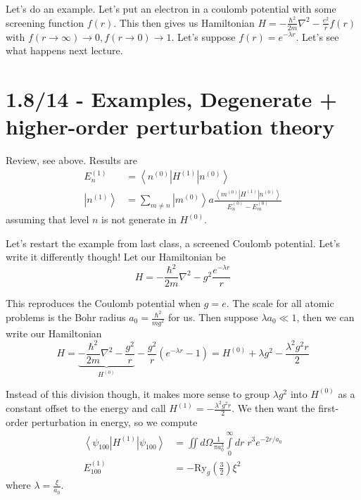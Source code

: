 \documentclass[10pt]{report}
\newcommand{\bra}[1]{\left<#1\right|}
\newcommand{\ket}[1]{\left|#1\right>}
\begin{document}
Let's do an example. Let's put an electron in a coulomb potential with some screening function $f(r)$. This then gives us Hamiltonian $H = -\frac{\hbar^2}{2m}\nabla^2 - \frac{e^2}{r}f(r)$ with $f(r \to \infty) \to 0, f(r \to 0) \to 1$. Let's suppose $f(r) = e^{-\lambda r}$. Let's see what happens next lecture.

\chapter{1.8/14 - Examples, Degenerate + higher-order perturbation theory}

Review, see above. Results are
\begin{align}
    E_n^{(1)} &= \bra{n^{(0)}}H^{(1)}\ket{n^{(0)}}\\
    \ket{n^{(1)}} &= \sum_{m \neq n}\ket{m^{(0)}}a\frac{\bra{m^{(0)}}H^{(1)}\ket{n^{(0)}}}{E_n^{(0)} - E_m^{(0)}}
\end{align}
assuming that level $n$ is not generate in $H^{\left( 0 \right)}$.

Let's restart the example from last class, a screened Coulomb potential. Let's write it differently though! Let our Hamiltonian be
\begin{equation}
    H = -\frac{\hbar^2}{2m}\nabla^2 - g^2\frac{e^{-\lambda r}}{r}
    \label{1.8.screenedH}
\end{equation}

This reproduces the Coulomb potential when $g = e$. The scale for all atomic problems is the Bohr radius $a_0 = \frac{\hbar^2}{mg^2}$ for us. Then suppose $\lambda a_0 \ll 1$, then we can write our Hamiltonian
\begin{equation}
    H = \underbrace{-\frac{\hbar^2}{2m}\nabla^2 - \frac{g^2}{r}}_{H^{(0)}} - \frac{g^2}{r}\left( e^{-\lambda r} - 1 \right) = H^{(0)} + \lambda g^2 - \frac{\lambda^2 g^2 r}{2}
    \label{1.8.perturbedH}
\end{equation}

Instead of this division though, it makes more sense to group $\lambda g^2$ into $H^{(0)}$ as a constant offset to the energy and call $H^{(1)} = -\frac{\lambda^2 g^2r}{2}$. We then want the first-order perturbation in energy, so we compute
\begin{align}
    \bra{\psi_{100}}H^{(1)}\ket{\psi_{100}} &= \iint d\Omega \frac{1}{\pi a_0^3}\displaystyle\int\limits_{0}^{\infty}dr \;r^3 e^{-2r/a_0}\\
    E_{100}^{(1)} &= -\mathrm{Ry}_g\left( \frac{3}{2} \right)\xi^2
    \label{1.8.perturbedSol}
\end{align}
where $\lambda = \frac{\xi}{a_0}$. 
\end{document}
